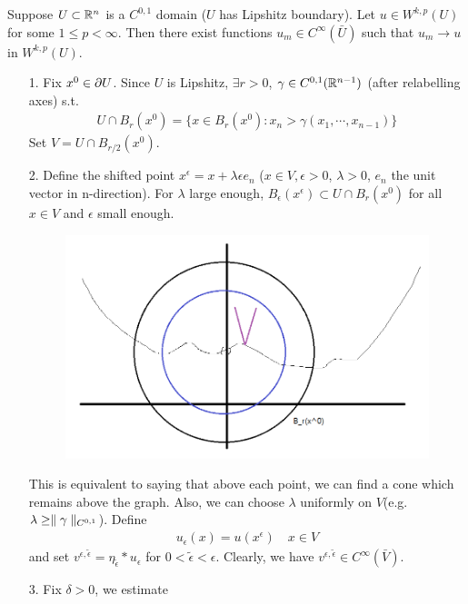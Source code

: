 \documentclass[10pt,a4paper]{report}
\newenvironment{proof}
{\begin{changemargin}{1cm}{0.5cm} 
	}%
	{\end{changemargin}
}
\begin{document}
\thm Suppose $U \subset \mathbb{R}^n$ is a $C^{0,1}$ domain ($U$ has Lipshitz boundary). Let $u\in W^{k,p}(U)$ for some $1\leq p <\infty$. Then there exist functions $u_m \in C^{\infty}(\bar{U})$ such that $u_m \rightarrow u$ in $W^{k,p}(U)$.
\begin{proof}
\pf \begin{itemize}
\item[1.] Fix $x^0 \in \partial U$. Since $U$ is Lipshitz, $\exists r>0$, $\gamma \in C^{0,1}(\mathbb{R}^{n-1})$ (after relabelling axes) s.t.
\begin{align*}
U \cap B_r(x^0) = \{ x\in B_r(x^0) : x_n > \gamma (x_1, \cdots, x_{n-1})\}
\end{align*}
Set $V = U \cap B_{r/2}(x^0)$.
\item[2. ] Define the shifted point $x^{\epsilon} = x+ \lambda \epsilon e_n$ ($x\in V, \epsilon >0$, $\lambda >0$, $e_n$ the unit vector in n-direction). For $\lambda$ large enough, $B_{\epsilon}(x^{\epsilon}) \subset U\cap B_r (x^0)$ for all $x\in V$ and $\epsilon$ small enough.
\begin{figure}[h]
	\centering
	\includegraphics[scale=0.5]{3}
\end{figure}
This is equivalent to saying that above each point, we can find a cone which remains above the graph.  Also, we can choose $\lambda$ uniformly on $V$(e.g. $\lambda \geq \parallel \gamma \parallel_{C^{0,1}}$). Define
\begin{align*}
u_{\epsilon}(x) = u(x^{\epsilon}) \quad x\in V
\end{align*}
and set $v^{\epsilon,\tilde{\epsilon}} = \eta_{\tilde{\epsilon}} * u_{\epsilon}$ for $0 < \tilde{\epsilon} <\epsilon$. Clearly, we have $v^{\epsilon, \tilde{\epsilon}} \in C^{\infty}(\bar{V})$.
\item[3.] Fix $\delta >0$, we estimate

\end{itemize}
\end{proof}
\end{document}
